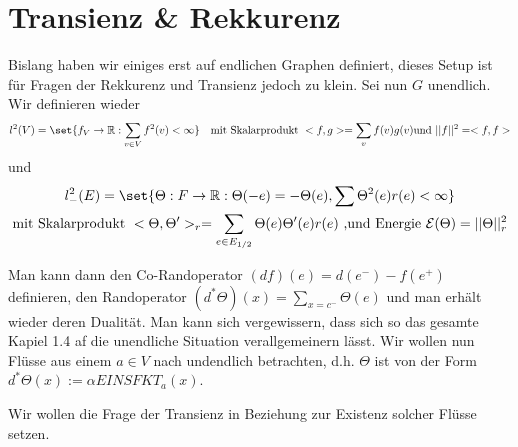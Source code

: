 \section{Transienz \& Rekkurenz}


Bislang haben wir einiges erst auf endlichen Graphen definiert, dieses Setup ist für Fragen der Rekkurenz und Transienz jedoch zu klein. Sei nun $G$ unendlich. Wir definieren wieder
\begin{align}
	l^2(V) = \set{f_V \to \Real: \sum\limits_{v\in V} f^2(v)<\infty } && \text{mit Skalarprodukt } <f,g> = \sum\limits_{v} f(v)g(v) \text{und } ||f||^2 = <f,f>
\end{align}
und
\begin{gather}
	l^2_-(E) = \set{\Theta:F \to \Real: \Theta(-e) = -\Theta(e), \sum \Theta^2(e)r(e) < \infty} \\
	 \text{mit Skalarprodukt } <\Theta, \Theta'>_r = \sum\limits_{e \in E_{1/2}} \Theta(e)\Theta'(e)r(e) \text{ ,und Energie } \mathcal{E}(\Theta) = ||\Theta||^2_r
\end{gather}

Man kann dann den Co-Randoperator $(df)(e)= d(e^-) - f(e^+)$ definieren, den Randoperator $(d^*\Theta)(x) = \sum\limits_{x = c^-}\Theta(e)$ und man erhält wieder deren Dualität. Man kann sich vergewissern, dass sich so das gesamte Kapiel 1.4  af die unendliche Situation verallgemeinern lässt. Wir wollen nun Flüsse aus einem $a \in V$ nach undendlich betrachten, d.h. $\Theta$ ist von der Form $d^*\Theta(x) := \alpha EINSFKT_{a}(x)$. 

Wir wollen die Frage der Transienz in Beziehung zur Existenz solcher Flüsse setzen.

